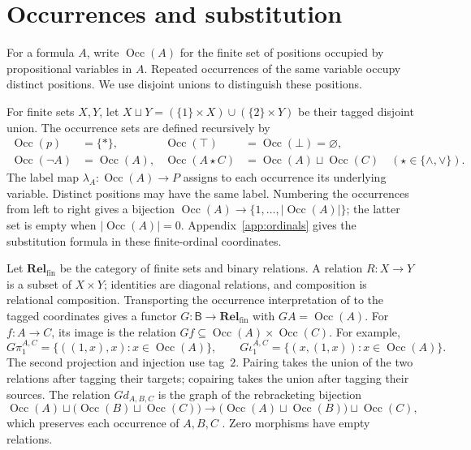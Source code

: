 \documentclass[11pt]{article}
\newcommand{\B}{\mathsf B}
\newcommand{\Occ}{\operatorname{Occ}}
\newcommand{\Rel}{\mathbf{Rel}_{\mathrm{fin}}}
\begin{document}
\section{Occurrences and substitution}\label{sec:occurrences}

For a formula $A$, write $\Occ(A)$ for the finite set of positions
occupied by propositional variables in $A$. Repeated occurrences of the
same variable occupy distinct positions. We use disjoint unions to
distinguish these positions.

For finite sets $X,Y$, let
$X\sqcup Y=(\{1\}\times X)\cup(\{2\}\times Y)$ be their tagged
disjoint union. The occurrence sets are defined recursively by
\[
 \begin{aligned}
 \Occ(p)&=\{*\},&
 \Occ(\top)&=\Occ(\bot)=\varnothing,\\
 \Occ(\neg A)&=\Occ(A),&
 \Occ(A\mathbin\star C)&=\Occ(A)\sqcup\Occ(C)
       \quad(\star\in\{\wedge,\vee\}).
 \end{aligned}
\]
The label map $\lambda_A:\Occ(A)\to P$ assigns to each occurrence
its underlying variable. Distinct positions may have the same label.
Numbering the occurrences from left to right gives a bijection
$\Occ(A)\to\{1,\ldots,|\Occ(A)|\}$; the latter set is empty when
$|\Occ(A)|=0$. Appendix~\ref{app:ordinals} gives the substitution
formula in these finite-ordinal coordinates.

Let $\Rel$ be the category of finite sets and binary relations.
A relation $R:X\to Y$ is a subset of $X\times Y$; identities are
diagonal relations, and composition is relational composition.
Transporting the occurrence interpretation of \cite{DP} to the
tagged coordinates gives a functor
$G:\B\to\Rel$ with $GA=\Occ(A)$. For $f:A\to C$, its image is
the relation $Gf\subseteq\Occ(A)\times\Occ(C)$.
For example,
\[
 G\pi_1^{A,C}=\{((1,x),x):x\in\Occ(A)\},\qquad
 G\iota_1^{A,C}=\{(x,(1,x)):x\in\Occ(A)\}.
\]
The second projection and injection use tag~$2$. Pairing takes the
union of the two relations after tagging their targets; copairing
takes the union after tagging their sources. The relation $Gd_{A,B,C}$
is the graph of the rebracketing bijection
\[
 \Occ(A)\sqcup\bigl(\Occ(B)\sqcup\Occ(C)\bigr)
 \longrightarrow
 \bigl(\Occ(A)\sqcup\Occ(B)\bigr)\sqcup\Occ(C),
\]
which preserves each occurrence of $A,B,C$
\cite[\S2.9, p.~60]{DP}. Zero morphisms have empty relations.
\end{document}
